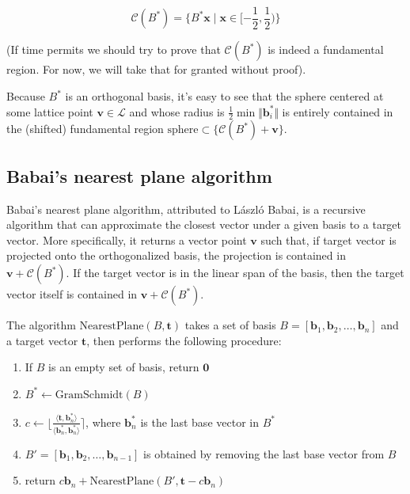 \documentclass[letterpaper,12pt]{article}
\begin{document}
$$
\mathcal{C}(B^\ast) = \{B^\ast\mathbf{x} \mid \mathbf{x} \in [-\frac{1}{2}, \frac{1}{2})\}
$$

(If time permits we should try to prove that $\mathcal{C}(B^\ast)$ is indeed a fundamental region. For now, we will take that for granted without proof).

Because $B^\ast$ is an orthogonal basis, it's easy to see that the sphere centered at some lattice point $\mathbf{v} \in \mathcal{L}$ and whose radius is $\frac{1}{2}\min \Vert \mathbf{b}_i^\ast\Vert$ is entirely contained in the (shifted) fundamental region $\text{sphere} \subset \{\mathcal{C}(B^\ast) + \mathbf{v}\}$.

\subsection{Babai's nearest plane algorithm}
Babai's nearest plane algorithm, attributed to László Babai, is a recursive algorithm that can approximate the closest vector under a given basis to a target vector. More specifically, it returns a vector point $\mathbf{v}$ such that, if target vector is projected onto the orthogonalized basis, the projection is contained in $\mathbf{v} + \mathcal{C}(B^\ast)$. If the target vector is in the linear span of the basis, then the target vector itself is contained in $\mathbf{v} + \mathcal{C}(B^\ast)$.

The algorithm $\text{NearestPlane}(B, \mathbf{t})$ takes a set of basis $B = [\mathbf{b}_1, \mathbf{b}_2, \ldots, \mathbf{b}_{n}]$ and a target vector $\mathbf{t}$, then performs the following procedure:

\begin{enumerate}
    \item If $B$ is an empty set of basis, return $\mathbf{0}$
    \item $B^\ast \leftarrow \text{GramSchmidt}(B)$
    \item $c \leftarrow \lfloor \frac{\langle\mathbf{t}, \mathbf{b}_n^\ast\rangle}{\langle\mathbf{b}_n^\ast, \mathbf{b}_n^\ast\rangle} \rceil$, where $\mathbf{b}_n^\ast$ is the last base vector in $B^\ast$
    \item $B' = [\mathbf{b}_1, \mathbf{b}_2, \ldots, \mathbf{b}_{n-1}]$ is obtained by removing the last base vector from $B$
    \item return $c\mathbf{b}_n + \text{NearestPlane}(B', \mathbf{t} - c\mathbf{b}_n)$
\end{enumerate}
\end{document}
